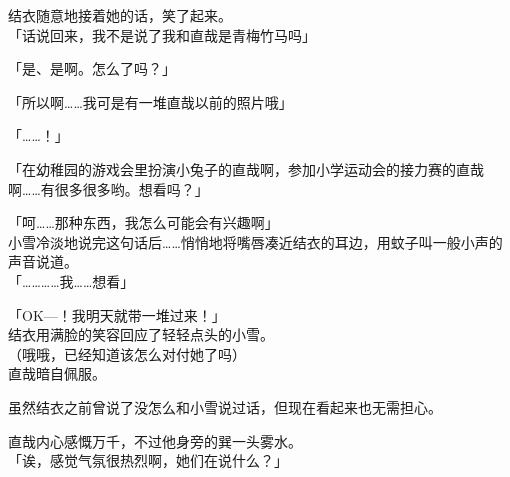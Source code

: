 结衣随意地接着她的话，笑了起来。\\

「话说回来，我不是说了我和直哉是青梅竹马吗」

「是、是啊。怎么了吗？」

「所以啊……我可是有一堆直哉以前的照片哦」

「……！」

「在幼稚园的游戏会里扮演小兔子的直哉啊，参加小学运动会的接力赛的直哉啊……有很多很多哟。想看吗？」

「呵……那种东西，我怎么可能会有兴趣啊」\\

小雪冷淡地说完这句话后……悄悄地将嘴唇凑近结衣的耳边，用蚊子叫一般小声的声音说道。\\

「…………我……想看」

「OK—！我明天就带一堆过来！」\\

结衣用满脸的笑容回应了轻轻点头的小雪。\\

（哦哦，已经知道该怎么对付她了吗）\\

直哉暗自佩服。

虽然结衣之前曾说了没怎么和小雪说过话，但现在看起来也无需担心。

直哉内心感慨万千，不过他身旁的巽一头雾水。\\

「诶，感觉气氛很热烈啊，她们在说什么？」

